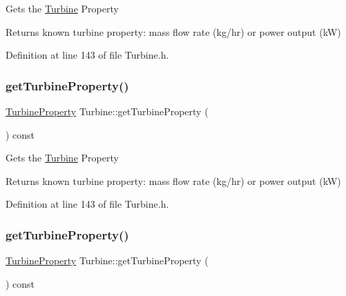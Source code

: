 Gets the \hyperlink{class_turbine}{Turbine} Property

\begin{DoxyReturn}{Returns}
known turbine property\+: mass flow rate (kg/hr) or power output (kW) 
\end{DoxyReturn}


Definition at line 143 of file Turbine.\+h.

\mbox{\label{class_turbine_a14f6eff49b501aa8c5a22d404dbeaac0}} 
\subsubsection{\texorpdfstring{get\+Turbine\+Property()}{getTurbineProperty()}\hspace{0.1cm}{\footnotesize\ttfamily [2/3]}}
{\footnotesize\ttfamily \hyperlink{class_turbine_a5db4f65cf2539e3837684d53221ade12}{Turbine\+Property} Turbine\+::get\+Turbine\+Property (\begin{DoxyParamCaption}{ }\end{DoxyParamCaption}) const\hspace{0.3cm}{\ttfamily [inline]}}

Gets the \hyperlink{class_turbine}{Turbine} Property

\begin{DoxyReturn}{Returns}
known turbine property\+: mass flow rate (kg/hr) or power output (kW) 
\end{DoxyReturn}


Definition at line 143 of file Turbine.\+h.

\mbox{\label{class_turbine_a14f6eff49b501aa8c5a22d404dbeaac0}} 
\subsubsection{\texorpdfstring{get\+Turbine\+Property()}{getTurbineProperty()}\hspace{0.1cm}{\footnotesize\ttfamily [3/3]}}
{\footnotesize\ttfamily \hyperlink{class_turbine_a5db4f65cf2539e3837684d53221ade12}{Turbine\+Property} Turbine\+::get\+Turbine\+Property (\begin{DoxyParamCaption}{ }\end{DoxyParamCaption}) const\hspace{0.3cm}{\ttfamily [inline]}}

